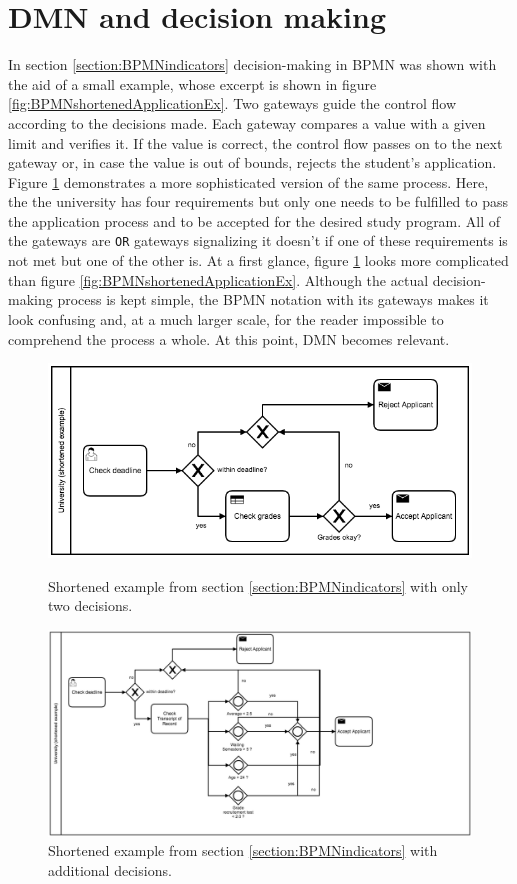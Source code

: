 \section{DMN and decision making}
In section \ref{section:BPMNindicators} decision-making in BPMN was shown with the aid of a small example, whose excerpt is shown in figure \ref{fig:BPMNshortenedApplicationEx}. Two gateways guide the control flow according to the decisions made. Each gateway compares a value with a given limit and verifies it. If the value is correct, the control flow passes on to the next gateway or, in case the value is out of bounds, rejects the student's application. 
Figure \ref{fig:BPMNexpandedApplicationEx} demonstrates a more sophisticated version of the same process. Here, the the university has four requirements but only one needs to be fulfilled to pass the application process and to be accepted for the desired study program. All of the gateways are \texttt{OR} gateways signalizing it doesn't if one of these requirements is not met but one of the other is. At a first glance, figure \ref{fig:BPMNexpandedApplicationEx} looks more complicated than figure \ref{fig:BPMNshortenedApplicationEx}. Although the actual decision-making process is kept simple, the BPMN notation with its gateways makes it look confusing and, at a much larger scale, for the reader impossible to comprehend the process a whole. At this point, DMN becomes relevant. 

\begin{figure}
  \centering
    \includegraphics[scale=0.5]{../figures/chapter_indicators/BPMN_Example_Student_Application_Short.png}
    \caption{Shortened example from section \ref{section:BPMNindicators} with only two decisions.}
  \label{fig:BPMNshortenedApplicationEx}
    \includegraphics[scale=0.4]{../figures/chapter_indicators/BPMN_Example_Student_Application_DMN_Short.png}
    \caption{Shortened example from section \ref{section:BPMNindicators} with additional decisions.}
  \label{fig:BPMNexpandedApplicationEx}
\end{figure}


